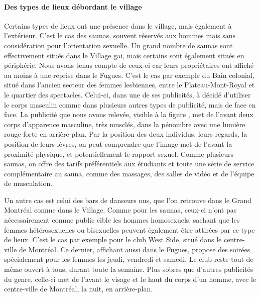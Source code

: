 \paragraph{Des types de lieux débordant le village}
Certains types de lieux ont une présence dans le village, mais également à l'extérieur.
C'est le cas des saunas, souvent réservés aux hommes mais sans considération pour l'orientation sexuelle.
Un grand nombre de saunas sont effectivement situés dans le Village gai, mais certains sont également situés en périphérie.
Nous avons tenus compte de ceux-ci car leurs propriétaires ont affiché au moins à une reprise dans le Fugues.
C'est le cas par exemple du Bain colonial, situé dans l'ancien secteur des femmes lesbiennes, entre le Plateau-Mont-Royal et le quartier des spectacles.
Celui-ci, dans une de ses publicités, à décidé d'utiliser le corps masculin comme dans plusieurs autres types de publicité, mais de face en face.
La publicité que nous avons relevée, visible à la figure , met de l'avant deux corps d'apparence masculine, très musclés, dans la pénombre avec une lumière rouge forte en arrière-plan.
Par la position des deux individus, leurs regards, la position de leurs lèvres, on peut comprendre que l'image met de l'avant la proximité physique, et potentiellement le rapport sexuel.
Comme plusieurs saunas, on offre des tarifs préférentiels aux étudiants et toute une série de service complémentaire au sauna, comme des massages, des salles de vidéo et de l'équipe de musculation.

Un autre cas est celui des bars de danseurs nus, que l'on retrouve dans le Grand Montréal comme dans le Village.
Comme pour les saunas, ceux-ci n'ont pas nécessairement comme public cible les hommes homosexuels, sachant que les femmes hétérosexuelles ou bisexuelles peuvent également être attirées par ce type de lieux.
C'est le cas par exemple pour le club West Side, situé dans le centre-ville de Montréal.
Ce dernier, affichant aussi dans le Fugues, propose des soirées spécialement pour les femmes les jeudi, vendredi et samedi.
Le club reste tout de même ouvert à tous, durant toute la semaine.
Plus sobres que d'autres publicités du genre, celle-ci met de l'avant le visage et le haut du corps d'un homme, avec le centre-ville de Montréal, la nuit, en arrière-plan.


